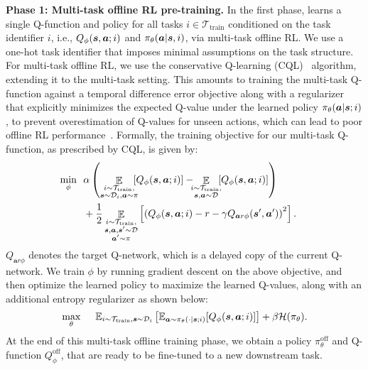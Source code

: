 \textbf{\textbf{Phase 1:} Multi-task offline RL pre-training.} In the first phase, \ptrmethodname learns a single Q-function and policy for all tasks $i \in \mathcal{T}_\text{train}$ conditioned on the task identifier $i$, i.e., $Q_\phi(\boldsymbol{s}, \boldsymbol{a}; i)$ and $\pi_\theta(\boldsymbol{a}|\boldsymbol{s}, i)$, via multi-task offline RL. We use a one-hot task identifier that imposes minimal assumptions on the task structure. For multi-task offline RL, we use the conservative Q-learning (CQL)~\citep{kumar2020conservative} algorithm, extending it to the multi-task setting. This amounts to training the multi-task Q-function against a temporal difference error objective along with a regularizer that explicitly minimizes the expected Q-value under the learned policy $\pi_\theta(\boldsymbol{a}|\boldsymbol{s}; i)$,
to prevent overestimation of Q-values for unseen actions, which can lead to poor offline RL performance~\citep{kumar2019stabilizing}. 
Formally, the training objective for our multi-task Q-function, as prescribed by CQL, is given by:
\begin{align*}
\label{eqn:cql_training}
\!\!\!\!\!\!\!\! \min_{\phi}~~ & \alpha\left(\mathop{\mathbb{E}}_{\substack{i \sim \mathcal{T}_\text{train},\\ \bs \sim \mathcal{D}_i, \mathbf{a} \sim \pi}} \!\!\!\!\left[Q_\phi(\bs,\mathbf{a}; i)\right] - \!\!\!\mathop{\mathbb{E}}_{\substack{i \sim \mathcal{T}_\text{train},\\ \bs, \mathbf{a} \sim \mathcal{D}}}\!\!\!\left[Q_\phi(\bs,\mathbf{a}; i)\right]\right) \\ 
& + \frac{1}{2} \mathop{\mathbb{E}}_{\substack{i \sim \mathcal{T}_\text{train},\\ \bs, \mathbf{a}, \bs' \sim \mathcal{D}\\\mathbf{a}' \sim \pi}}\left[\left(Q_\phi(\bs, \mathbf{a}; i) - r - \gamma Q_{\mathbf{a}r{\phi}}(\bs', \mathbf{a}')\right)^2 \right].
\end{align*}  
${Q}_{\mathbf{a}r{\phi}}$ denotes the target Q-network, which is a delayed copy of the current Q-network. We train $\phi$ by running gradient descent on the above objective, and then optimize the learned policy to maximize the learned Q-values, along with an additional entropy regularizer as shown below:
\begin{align*}
    \max_{\theta}~~~~ \mathbb{E}_{{i \sim \mathcal{T}_\text{train}, \boldsymbol{s} \sim \mathcal{D}_i}}\left[ \mathbb{E}_{\boldsymbol{a} \sim \pi_\theta(\cdot|\boldsymbol{s}; i)}[Q_\phi(\boldsymbol{s}, \boldsymbol{a}; i)]  \right] + \beta \mathcal{H}(\pi_\theta).
\end{align*}
At the end of this multi-task offline training phase, we obtain a policy $\pi^\text{off}_\theta$ and Q-function $Q^\text{off}_\phi$, that are ready to be fine-tuned to a new downstream task.

